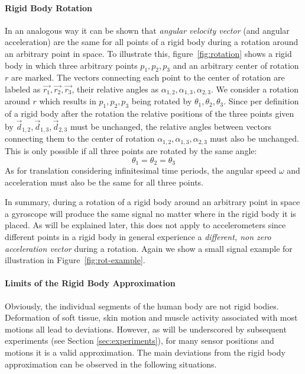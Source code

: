 \paragraph{Rigid Body Rotation} In an analogous way it can be shown that 
{\em  angular velocity  vector} (and  angular acceleration)
are the same for all points of a rigid body during a rotation around an
arbitrary point in space. To illustrate this, figure~\ref{fig:rotation} 
shows a rigid body in which three arbitrary
points $p_1,p_2,p_3$ and an arbitrary
center of rotation $r$ are marked. The vectors connecting each point to 
the center of rotation are labeled as $\vec{r_1}, \vec{r_2},\vec{r_3}$, 
their relative angles as $\alpha_{1,2},\alpha_{1,3},\alpha_{2,3}$. 
We consider a rotation around $r$ which results in 
 $p_1,p_2,p_3$ being rotated by $\theta_1,\theta_2,\theta_3$. 
Since per definition of a rigid body
after the rotation the relative positions of the three points  given
by $\vec{d}_{1,2},\vec{d}_{1,3},\vec{d}_{2,3}$ must be unchanged, the
relative angles between vectors connecting them to the center of
rotation $\alpha_{1,2},\alpha_{1,3},\alpha_{2,3}$  must also be
unchanged. This is only possible if all three points are
rotated by the same angle: 
\begin{equation}
\theta_1=\theta_2=\theta_3
\end{equation}
As for translation considering infinitesimal time
periods, the angular speed $\omega$ and acceleration must
also be the same for all three points. 

In summary, during a rotation of a
rigid body around an arbitrary point in space a gyroscope will 
produce the same signal no matter where in the rigid body it is placed.
As will be explained later, this does not apply to accelerometers
since  different points in a rigid body in general
experience a  {\em different, non zero acceleration vector} during a rotation.
Again we show a small signal example for illustration in Figure~\ref{fig:rot-example}.


\paragraph{Limits of the Rigid Body Approximation}
Obviously, the individual segments of the human body are not
rigid bodies. Deformation of soft tissue, skin motion and
muscle activity associated with most motions all lead to
deviations. However, as will be underscored by subsequent experiments
(see Section \ref{sec:experiments}), for many sensor positions and motions
it is a valid approximation. The main deviations from the rigid body
approximation can be observed in the following situations.

